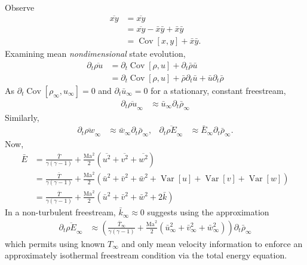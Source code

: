\documentclass[letterpaper,11pt,nointlimits,reqno]{amsart}
\newcommand{\Mach}[1][]{\ensuremath{\mbox{Ma}_{#1}}}
\newcommand{\Cov}[2]{\ensuremath{\operatorname{Cov}\left[{#1},{#2}\right]}}
\newcommand{\Var}[1]{\ensuremath{\operatorname{Var}\left[{#1}\right]}}
\begin{document}
Observe
\begin{align}
  \overline{xy} &= \overline{xy}
\\              &= \overline{xy} - \bar{x} \bar{y} + \bar{x} \bar{y}
\\              &= \Cov{x}{y} + \bar{x} \bar{y}
.
\end{align}
Examining mean \emph{nondimensional} state evolution,
\begin{align}
  \partial_t \overline{\rho u} &= \partial_t \Cov{\rho}{u}
                                + \partial_t \bar{\rho} \bar{u}
\\
                               &= \partial_t \Cov{\rho}{u}
                                + \bar{\rho} \partial_t \bar{u}
                                + \bar{u}    \partial_t \bar{\rho}
\end{align}
As $\partial_t \Cov{\rho_\infty}{u_\infty} = 0$ and $\partial_t \bar{u}_\infty
= 0$ for a stationary, constant freestream,
\begin{align}
  \partial_t \overline{\rho u}_\infty
  &\approx \bar{u}_\infty \partial_t \bar{\rho}_\infty
\end{align}
Similarly,
\begin{align}
  \partial_t \overline{\rho w}_\infty
  &\approx \bar{w}_\infty \partial_t \bar{\rho}_\infty,
&
  \partial_t \overline{\rho E}_\infty
  &\approx \bar{E}_\infty \partial_t \bar{\rho}_\infty
  .
\end{align}
Now,
\begin{align}
  \bar{E}
  &= \frac{\bar{T}}{\gamma\left( \gamma-1 \right)}
   + \frac{\Mach^2}{2}\left(\overline{u^2}+\overline{v^2}+\overline{w^2}\right)
\\
  &= \frac{\bar{T}}{\gamma\left( \gamma-1 \right)}
   + \frac{\Mach^2}{2}\left(\bar{u}^2+\bar{v}^2+\bar{w}^2
                            +\Var{u} +\Var{v} +\Var{w}\right)
\\
  &= \frac{\bar{T}}{\gamma\left( \gamma-1 \right)}
   + \frac{\Mach^2}{2}\left(\bar{u}^2+\bar{v}^2+\bar{w}^2+2\bar{k}\right)
\end{align}
In a non-turbulent freestream, $\bar{k}_\infty\approx{}0$ suggests
using the approximation
\begin{align}
  \partial_t \overline{\rho E}_\infty
&\approx
  \left(
         \frac{\bar{T}_\infty}{\gamma\left( \gamma-1 \right)}
       + \frac{\Mach^2}{2}\left(  \bar{u}_\infty^2
                                 +\bar{v}_\infty^2
                                 +\bar{w}_\infty^2\right)
  \right)
  \partial_t \bar{\rho}_\infty
\end{align}
which permits using known $T_\infty$ and only mean velocity information
to enforce an approximately isothermal freestream condition via the
total energy equation.
\end{document}
